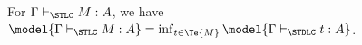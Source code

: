 \begin{corollary}\label{cor:T(M)=M}
 For $\Gamma\vdash_{\STLC} M:A$, we have %
$\model{\Gamma\vdash_{\STLC} M:A}=\inf_{t\in\Te{M}} \model{\Gamma\vdash_{\STDLC} t:A}$. %
\end{corollary}

%
%

